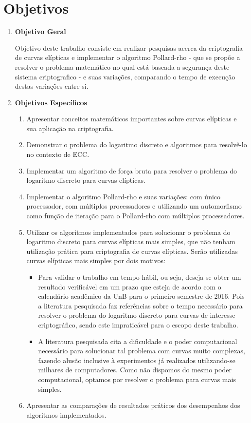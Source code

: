 \section*{Objetivos}
\begin{enumerate}
	\item \textbf{Objetivo Geral}

Objetivo deste trabalho consiste em realizar pesquisas acerca da criptografia de curvas elípticas e implementar o algoritmo Pollard-rho - que se propõe a resolver o problema matemático no qual está baseada a segurança deste sistema criptografico - e suas variações, comparando o tempo de execução destas variações entre si.

	\item \textbf{Objetivos Específicos}
	\begin{enumerate}
		\item Apresentar conceitos matemáticos importantes sobre curvas elípticas e sua aplicação na criptografia.
		\item Demonstrar o problema do logaritmo discreto e algoritmos para resolvê-lo no contexto de ECC.
		\item Implementar um algoritmo de força bruta para resolver o problema do logaritmo discreto para curvas elípticas.
		\item Implementar o algoritmo Pollard-rho e suas variações: com único processador, com múltiplos processadores e utilizando um automorfismo como função de iteração para o Pollard-rho com múltiplos processadores.
		\item Utilizar os algoritmos implementados para solucionar o problema do logaritmo discreto para curvas elípticas mais simples, que não tenham utilização prática para criptografia de curvas elípticas. Serão utilizadas curvas elípticas mais simples por dois motivos:
		\begin{itemize}
			\item Para validar o trabalho em tempo hábil, ou seja, deseja-se obter um resultado verificável em um prazo que esteja de acordo com o calendário acadêmico da UnB para o primeiro semestre de 2016. Pois a literatura pesquisada faz referências sobre o tempo necessário para resolver o problema do logaritmo discreto para curvas de interesse criptográfico, sendo este impraticável para o escopo deste trabalho.
			\item A literatura pesquisada cita a dificuldade e o poder computacional necessário para solucionar tal problema com curvas muito complexas, fazendo alusão inclusive à experimentos já realizados utilizando-se milhares de computadores. Como não dispomos do mesmo poder computacional, optamos por resolver o problema para curvas mais simples.
		\end{itemize}
		\item Apresentar as comparações de resultados práticos dos desempenhos dos algoritmos implementados.
	\end{enumerate}
\end{enumerate}
